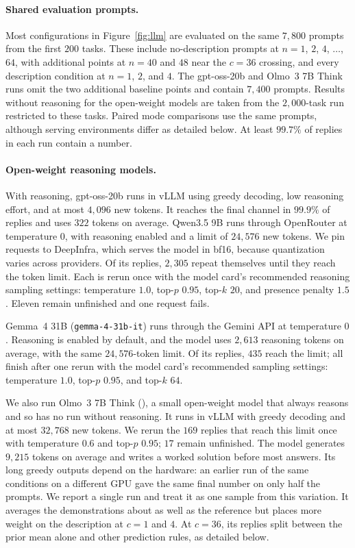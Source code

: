 \documentclass{article}
\theoremstyle{definition}
\begin{document}
\paragraph{Shared evaluation prompts.}
Most configurations in Figure~\ref{fig:llm} are evaluated on the same $7{,}800$ prompts from the first $200$ tasks. These include no-description prompts at $n=1$, $2$, $4$, $\ldots$, $64$, with additional points at $n=40$ and $48$ near the $c=36$ crossing, and every description condition at $n=1$, $2$, and $4$. The gpt-oss-20b and Olmo~3 7B Think \citep{olmo2025three} runs omit the two additional baseline points and contain $7{,}400$ prompts. Results without reasoning for the open-weight models are taken from the $2{,}000$-task run restricted to these tasks. Paired mode comparisons use the same prompts, although serving environments differ as detailed below. At least $99.7\%$ of replies in each run contain a number.

\paragraph{Open-weight reasoning models.}
With reasoning, gpt-oss-20b runs in vLLM using greedy decoding, low reasoning effort, and at most $4{,}096$ new tokens. It reaches the final channel in $99.9\%$ of replies and uses $322$ tokens on average. Qwen3.5 9B runs through OpenRouter at temperature $0$, with reasoning enabled and a limit of $24{,}576$ new tokens. We pin requests to DeepInfra, which serves the model in bf16, because quantization varies across providers. Of its replies, $2{,}305$ repeat themselves until they reach the token limit. Each is rerun once with the model card's recommended reasoning sampling settings: temperature $1.0$, top-$p$ $0.95$, top-$k$ $20$, and presence penalty $1.5$. Eleven remain unfinished and one request fails.

Gemma~4 31B (\texttt{gemma-4-31b-it}) runs through the Gemini API at temperature $0$. Reasoning is enabled by default, and the model uses $2{,}613$ reasoning tokens on average, with the same $24{,}576$-token limit. Of its replies, $435$ reach the limit; all finish after one rerun with the model card's recommended sampling settings: temperature $1.0$, top-$p$ $0.95$, and top-$k$ $64$.

We also run Olmo~3 7B Think (), a small open-weight model that always reasons and so has no run without reasoning. It runs in vLLM with greedy decoding and at most $32{,}768$ new tokens. We rerun the $169$ replies that reach this limit once with temperature $0.6$ and top-$p$ $0.95$; $17$ remain unfinished. The model generates $9{,}215$ tokens on average and writes a worked solution before most answers. Its long greedy outputs depend on the hardware: an earlier run of the same conditions on a different GPU gave the same final number on only half the prompts. We report a single run and treat it as one sample from this variation. It averages the demonstrations about as well as the reference but places more weight on the description at $c=1$ and $4$. At $c=36$, its replies split between the prior mean alone and other prediction rules, as detailed below.
\end{document}
